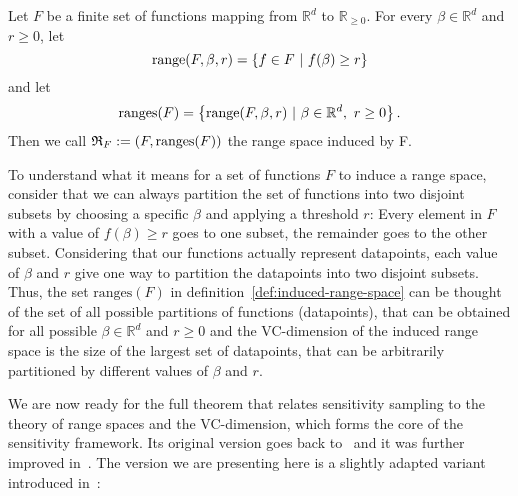 \begin{definition}
    \label{def:induced-range-space}
    Let $F$ be a finite set of functions mapping from $\mathbb{R}^d$ to
    $\mathbb{R}_{\geq 0}$.
    For every $\beta \in \mathbb{R}^d$ and $r \geq 0$, let
    \begin{equation*}
        \textup{range}(F, \beta, r) = \left\{ f \in F \ | \  f(\beta) \geq r  \right\}
    \end{equation*}
    and let
    \begin{equation*}
        \textup{ranges}(F) = \left\{ \textup{range}(F, \beta, r) \ | \ \beta \in \mathbb{R}^d, \ r \geq 0  \right\}.
    \end{equation*}
    Then we call $\mathfrak{R}_F := (F, \textup{ranges}(F))$ the range space induced by F.
\end{definition}

To understand what it means for a set of functions $F$ to induce
a range space, consider that we can always partition the set
of functions into two disjoint subsets by choosing
a specific $\beta$ and applying a threshold $r$:
Every element in $F$ with a value of $f(\beta) \geq r$ goes to
one subset, the remainder goes to the other subset.
Considering that our functions actually represent datapoints,
each value of $\beta$ and $r$ give one way to partition the
datapoints into two disjoint subsets.
Thus, the set $\text{ranges}(F)$ in definition~\ref{def:induced-range-space}
can be thought of the set of all possible partitions of
functions (datapoints), that can be obtained for all
possible $\beta \in \mathbb{R}^d$ and $r \geq 0$ and the
VC-dimension of the induced range space is the size of the
largest set of datapoints, that can be arbitrarily partitioned
by different values of $\beta$ and $r$.

We are now ready for the full theorem that relates sensitivity sampling
to the theory of range spaces and the VC-dimension, which forms
the core of the sensitivity framework.
Its original version goes back to~\cite{feldman-langberg-coresets}
and it was further improved in~\cite{braverman-feldman-coresets}.
The version we are presenting here is a slightly
adapted variant introduced in~\cite{big-data-tiny-data}:

